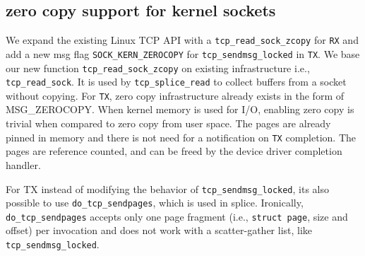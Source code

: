 \subsection{zero copy support for kernel sockets}
We expand the existing Linux TCP API with a \texttt{tcp\_read\_sock\_zcopy} for \texttt{RX} and add a new msg flag \texttt{SOCK\_KERN\_ZEROCOPY} for \texttt{tcp\_sendmsg\_locked} in \texttt{TX}. We base our new function \texttt{tcp\_read\_sock\_zcopy} on existing infrastructure i.e., \texttt{tcp\_read\_sock}. It is used by \texttt{tcp\_splice\_read} to collect buffers from a socket without copying. For \texttt{TX}, zero copy infrastructure already exists in the form of MSG\_ZEROCOPY\cite{desendmsg}. When kernel memory is used for I/O, enabling zero copy is trivial when compared to zero copy from user space. The pages are already pinned in memory and there is not need for a notification on \texttt{TX} completion. The pages are reference counted, and can be freed by the device driver completion handler.


For TX instead of modifying the behavior of \texttt{tcp\_sendmsg\_locked}, its also possible to use \texttt{do\_tcp\_sendpages}, which is used in splice. Ironically, \texttt{do\_tcp\_sendpages} accepts only one page fragment (i.e., \texttt{struct page}, size and offset) per invocation and does not work with a scatter-gather list, like \texttt{tcp\_sendmsg\_locked}.

